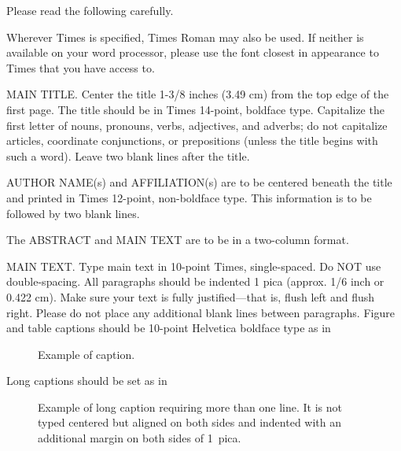 \documentclass[times, 10pt,twocolumn]{article}
\begin{document}
Please read the following carefully.






Wherever Times is specified, Times Roman may also be used. If neither is 
available on your word processor, please use the font closest in 
appearance to Times that you have access to.

MAIN TITLE. Center the title 1-3/8 inches (3.49 cm) from the top edge of 
the first page. The title should be in Times 14-point, boldface type. 
Capitalize the first letter of nouns, pronouns, verbs, adjectives, and 
adverbs; do not capitalize articles, coordinate conjunctions, or 
prepositions (unless the title begins with such a word). Leave two blank 
lines after the title.

AUTHOR NAME(s) and AFFILIATION(s) are to be centered beneath the title 
and printed in Times 12-point, non-boldface type. This information is to 
be followed by two blank lines.

The ABSTRACT and MAIN TEXT are to be in a two-column format. 

MAIN TEXT. Type main text in 10-point Times, single-spaced. Do NOT use 
double-spacing. All paragraphs should be indented 1 pica (approx. 1/6 
inch or 0.422 cm). Make sure your text is fully justified---that is, 
flush left and flush right. Please do not place any additional blank 
lines between paragraphs. Figure and table captions should be 10-point 
Helvetica boldface type as in
\begin{figure}[h]
   \caption{Example of caption.}
\end{figure}

\noindent Long captions should be set as in 
\begin{figure}[h] 
   \caption{Example of long caption requiring more than one line. It is 
     not typed centered but aligned on both sides and indented with an 
     additional margin on both sides of 1~pica.}
\end{figure}
\end{document}
